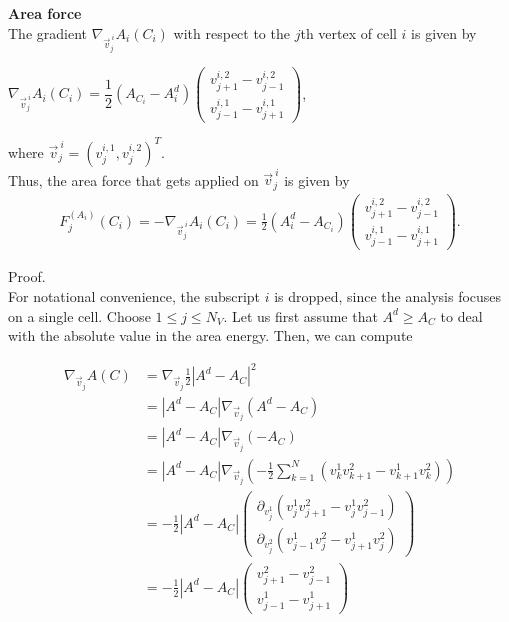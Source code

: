 \begin{proposition} \textbf{Area force} \\
	The gradient $\nabla_{\vec{v}^{\: i}_j} A_i(C_i)$ with respect to the $j$th vertex of cell $i$ is given by 
	\begin{center}
		$\nabla_{\vec{v}^{\: i}_j} A_i(C_i) = \dfrac{1}{2} (A_{C_i} - A_i^d) \begin{pmatrix} v_{j+1}^{i,2} - v_{j-1}^{i,2} \\[0.5em]  v_{j-1}^{i,1} - v_{j+1}^{i,1} \end{pmatrix}$, 
	\end{center}
	where $\vec{v}^{\: i}_j = (v_{j}^{i,1}, v_{j}^{i,2})^T$. \\

	Thus, the area force that gets applied on $\vec{v}^{\: i}_j$ is given by 
	\begin{align}
		F_{j}^{(A_i)}(C_i) 
		= - \nabla_{\vec{v}^{\: i}_j} A_i(C_i) 
		= \frac{1}{2}(A_i^d - A_{C_i}) \begin{pmatrix} v_{j+1}^{i,2} - v_{j-1}^{i,2} \\[0.5em]  v_{j-1}^{i,1} - v_{j+1}^{i,1} \end{pmatrix}.
	\end{align}



	Proof.\\
	For notational convenience, the subscript $i$ is dropped, since the analysis focuses on a single cell.
	Choose $1 \leq j \leq N_V$.  
	Let us first assume that $A^d \geq A_{C}$ to deal with the absolute value in the area energy. 
	Then, we can compute 
 
	\begin{align*}
		\nabla_{\vec{v}_j} A(C) &= \nabla_{\vec{v}_j} \frac{1}{2} | A^d - A_{C} |^2  \\ 
		&=   |A^d - A_{C}| \nabla_{\vec{v}_j} ( A^d - A_{C})  \\
		&=   |A^d - A_{C}| \nabla_{\vec{v}_j} ( - A_{C}) \\ 
		&=   |A^d - A_{C}| \nabla_{\vec{v}_j} ( - \frac{1}{2} \sum\limits_{k = 1}^{N} (v_k^1 v_{k+1}^2 - v_{k+1}^1 v_k^2)) \\[0.5em]  
		&=   - \frac{1}{2} |A^d - A_{C}| \begin{pmatrix}
			\partial_{v_j^1} (v_j^1 v_{j+1}^2 - v_j^1 v_{j-1}^2)  \\[0.5em]
			\partial_{v_j^2} (v_{j-1}^1 v_j^2 - v_{j+1}^1 v_j^2)
		\end{pmatrix} \\[0.5em] 
		&=   - \frac{1}{2} |A^d - A_{C}| \begin{pmatrix}
			  v_{j+1}^2 - v_{j-1}^2  \\
			 v_{j-1}^1  - v_{j+1}^1 
		\end{pmatrix} 
	\end{align*}


\end{proposition}
